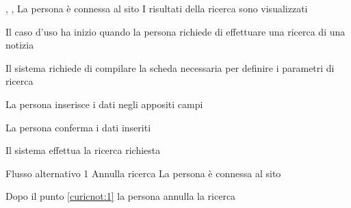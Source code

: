 {, , }
{La persona è connessa al sito}
{I risultati della ricerca sono visualizzati}
{\begin{enumCU}
	\item Il caso d'uso ha inizio quando la persona richiede di effettuare una ricerca di una notizia
	\item Il sistema richiede di compilare la scheda necessaria per definire i parametri di ricerca
	\item La persona inserisce i dati negli appositi campi \label{curicnot:1}
	\item La persona conferma i dati inseriti
	\item Il sistema effettua la ricerca richiesta
\end{enumCU}}
%
{Flusso alternativo 1}%
{Annulla ricerca}%
{La persona è connessa al sito}%
{\postNulle}%
{\begin{enumCU}
		\item Dopo il punto \ref{curicnot:1} la persona annulla la ricerca
	\end{enumCU}}%

%

